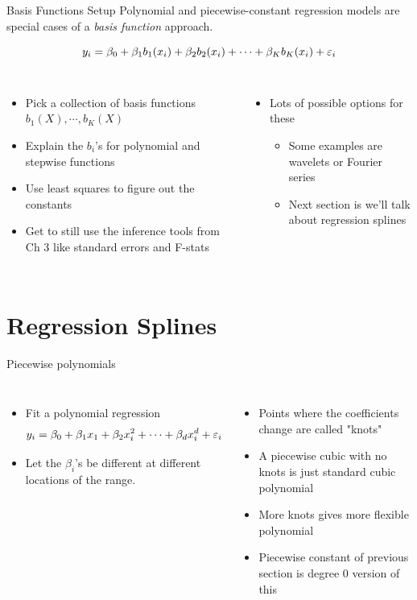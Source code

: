 \documentclass[aspectratio=169,usenames,dvipsnames]{beamer}
\newcommand{\InstructorList}[1]{
\begin{itemize}
	\color{orange}
	#1
\end{itemize}
}
\begin{document}
\begin{frame}[t]{Basis Functions Setup}
Polynomial and piecewise-constant regression models are special cases of a \textit{basis function} approach.

\begin{equation*}
	y_i = \beta_0 + \beta_1b_1(x_i) + \beta_2 b_2(x_i) + \cdots + \beta_K b_K(x_i) + \varepsilon_i
\end{equation*}

\begin{columns}
\centering
\InstructorList{
  \item Pick a collection of basis functions $b_1(X),\cdots,b_K(X)$
	\item Explain the $b_i$'s for polynomial and stepwise functions
	\item Use least squares to figure out the constants
	\item Get to still use the inference tools from Ch 3 like standard errors and F-stats

}

\centering

\InstructorList{
	\item Lots of possible options for these
	\InstructorList{
	  \item Some examples are wavelets or Fourier series
		\item Next section is we'll talk about regression splines
	}
}


\end{columns}

\end{frame}
\section{Regression Splines}


\begin{frame}[c]{Piecewise polynomials}

\begin{columns}
\centering
\begin{itemize}
	\item Fit a polynomial regression
\begin{equation*}
	y_i = \beta_0 + \beta_1x_1 + \beta_2x_i^2 + \cdots + \beta_dx_i^d + \varepsilon_i
\end{equation*}
\item Let the $\beta_i$'s be different at different locations of the range.
\end{itemize}
\centering
\InstructorList{
  \item Points where the coefficients change are called "knots"
	\item A piecewise cubic with no knots is just standard cubic polynomial
	\item More knots gives more flexible polynomial
	\item Piecewise constant of previous section is degree 0 version of this
}

\end{columns}

\end{frame}
\end{document}
